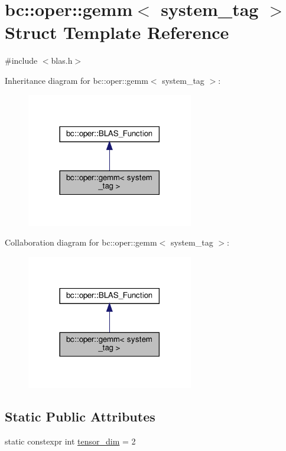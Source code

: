 \hypertarget{structbc_1_1oper_1_1gemm}{}\section{bc\+:\+:oper\+:\+:gemm$<$ system\+\_\+tag $>$ Struct Template Reference}
\label{structbc_1_1oper_1_1gemm}


{\ttfamily \#include $<$blas.\+h$>$}



Inheritance diagram for bc\+:\+:oper\+:\+:gemm$<$ system\+\_\+tag $>$\+:\nopagebreak
\begin{figure}[H]
\begin{center}
\leavevmode
\includegraphics[width=206pt]{structbc_1_1oper_1_1gemm__inherit__graph}
\end{center}
\end{figure}


Collaboration diagram for bc\+:\+:oper\+:\+:gemm$<$ system\+\_\+tag $>$\+:\nopagebreak
\begin{figure}[H]
\begin{center}
\leavevmode
\includegraphics[width=206pt]{structbc_1_1oper_1_1gemm__coll__graph}
\end{center}
\end{figure}
\subsection*{Static Public Attributes}
\begin{DoxyCompactItemize}
\item 
static constexpr int \hyperlink{structbc_1_1oper_1_1gemm_a7dc7c0c3945826526a6c77bd680bd0c1}{tensor\+\_\+dim} = 2
\end{DoxyCompactItemize}
